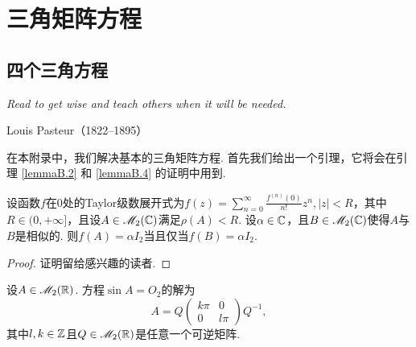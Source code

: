 \chapter{三角矩阵方程}
\section{四个三角方程}

\begin{proverb}
  { \itshape
  \hfill Read to get wise and teach others
              when it will be needed.
  }

\hfill Louis Pasteur（1822–1895）
\end{proverb}

在本附录中，我们解决基本的三角矩阵方程. 首先我们给出一个引理，它将会在引理 \ref{lemmaB.2} 和 \ref{lemmaB.4} 的证明中用到.

\begin{lemma}
  设函数$f$在0处的Taylor级数展开式为$f(z)=\sum_{n=0}^\infty\frac{f^{(n)}(0)}{n!}z^n,|z|<R$，其中$R\in(0,+\infty]$，且设$A\in\mathscr M_2(\mathbb C)$满足$\rho(A)<R$. 设$\alpha\in\mathbb C$，且$B\in\mathscr M_2(\mathbb C)$使得$A$与$B$是相似的. 则$f(A)=\alpha I_2$当且仅当$f(B)=\alpha I_2$.
\end{lemma}
\begin{proof}
  证明留给感兴趣的读者.
\end{proof}

\begin{mybox}
\begin{lemma}
  设$A\in\mathscr M_2(\mathbb R)$. 方程$\sin A=O_2$的解为
  \[
    A = Q\begin{pmatrix}
      k\pi & 0 \\
      0 & l\pi
    \end{pmatrix}Q^{-1},
  \]
  其中$l,k\in\mathbb Z$且$Q\in\mathscr M_2(\mathbb R)$是任意一个可逆矩阵.
\end{lemma}
\end{mybox}

